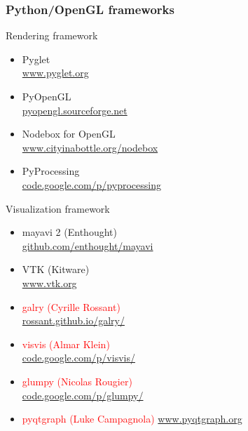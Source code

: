 \documentclass[10pt]{beamer}
\begin{document}
\begin{frame}
  \frametitle{Python/OpenGL frameworks}

  \begin{block}{Rendering framework}
    \begin{multicols}{2}
      \begin{itemize}
      \item Pyglet\\
        {\scriptsize \url{www.pyglet.org}}
      \item PyOpenGL\\
        {\scriptsize \url{pyopengl.sourceforge.net}}
      \item Nodebox for OpenGL\\
        {\scriptsize \url{www.cityinabottle.org/nodebox}}
      \item PyProcessing\\
        {\scriptsize \url{code.google.com/p/pyprocessing}}
      \end{itemize}
    \end{multicols}
  \end{block}

  \begin{block}{Visualization framework}
    \begin{multicols}{2}
    \begin{itemize}
    \item mayavi 2 {\scriptsize (Enthought)}\\
      {\scriptsize \url{github.com/enthought/mayavi}}
    \item VTK {\scriptsize (Kitware)}\\
      {\scriptsize \url{www.vtk.org}}
    \item \textcolor{red}{galry {\scriptsize (Cyrille Rossant)}}\\
      {\scriptsize \url{rossant.github.io/galry/}}
    \item \textcolor{red}{visvis {\scriptsize (Almar Klein)}}\\
      {\scriptsize \url{code.google.com/p/visvis/}}
    \item \textcolor{red}{glumpy {\scriptsize (Nicolas Rougier)}}\\
      {\scriptsize \url{code.google.com/p/glumpy/}}
    \item \textcolor{red}{pyqtgraph {\scriptsize (Luke Campagnola)}}
      {\scriptsize \url{www.pyqtgraph.org}}
    \end{itemize}
    \end{multicols}
  \end{block}


\end{frame}
\end{document}
